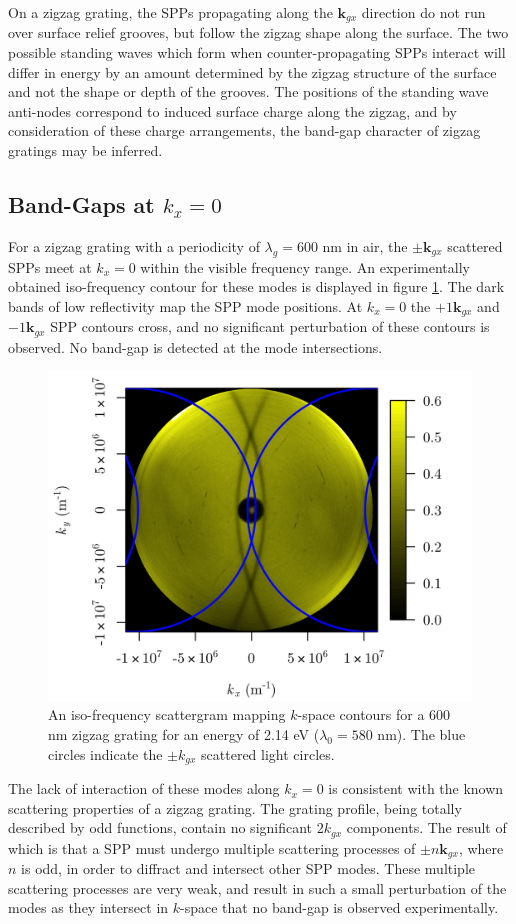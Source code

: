 On a zigzag grating, the SPPs propagating along the $\mathbf{k}_{gx}$ direction do not run over surface relief grooves, but follow the zigzag shape along the surface. The two possible standing waves which form when counter-propagating SPPs interact will differ in energy by an amount determined by the zigzag structure of the surface and not the shape or depth of the grooves. The positions of the standing wave anti-nodes correspond to induced surface charge along the zigzag, and by consideration of these charge arrangements, the band-gap character of zigzag gratings may be inferred.

\subsection{Band-Gaps at $k_x=0$}
For a zigzag grating with a periodicity of $\lambda_g= 600$ nm in air, the $\pm\mathbf{k}_{gx}$ scattered SPPs meet at $k_x=0$ within the visible frequency range. An experimentally obtained iso-frequency contour for these modes is displayed in figure \ref{fig:no-interacting-scattergram}. The dark bands of low reflectivity map the SPP mode positions. At $k_x=0$ the $+1\mathbf{k}_{gx}$ and $-1\mathbf{k}_{gx}$ SPP contours cross, and no significant perturbation of these contours is observed. No band-gap is detected at the mode intersections. 
\begin{figure}
\begin{center}
\includegraphics[width=0.7\linewidth]{scattergrams/figure-580nm-scattergram-withaxes.png}
\end{center}
\caption[An iso-frequency scattergram mapping $k$-space contours for a 600 nm zigzag grating for an energy of 2.14 eV]{An iso-frequency scattergram mapping $k$-space contours for a 600 nm zigzag grating for an energy of 2.14 eV ($\lambda_0=580$ nm). The blue circles indicate the $\pm k_{gx}$ scattered light circles.\label{fig:no-interacting-scattergram}}
\end{figure}
The lack of interaction of these modes along $k_x=0$ is consistent with the known scattering properties of a zigzag grating. The grating profile, being totally described by odd functions, contain no significant $2k_{gx}$ components. The result of which is that a SPP must undergo multiple scattering processes of $\pm n \mathbf{k}_{gx}$, where $n$ is odd, in order to diffract and intersect other SPP modes. These multiple scattering processes are very weak, and result in such a small perturbation of the modes as they intersect in $k$-space that no band-gap is observed experimentally. 

